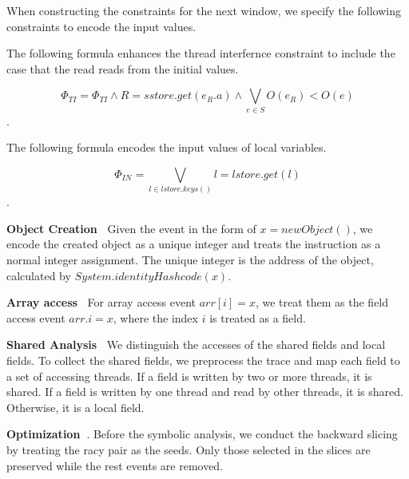 When constructing the constraints for the next window, we specify the following constraints to encode the input values.

The following formula enhances the thread interfernce constraint to include the case that the read reads from the initial values. 

$$\Phi_{TI}=\Phi_{TI} \wedge  R=sstore.get(e_R.a) \wedge \bigvee_{e\in S} O(e_R)<O(e)$$.

The following formula encodes the input values of local variables. 

$$\Phi_{IN}=\bigvee_{l\in lstore.keys()} l=lstore.get(l)$$.
 

{\bf Object Creation\ } Given the event in the form of $x=new Object()$, we encode the created object as a unique integer and treats the instruction as a normal integer assignment. The unique integer is the address of the object, calculated by $System.identityHashcode(x)$.


{\bf Array access\ } For array access event $arr[i]=x$, we treat them as the field access event $arr.i=x$, where the index $i$ is treated as a field. 

{\bf Shared Analysis\ } We distinguish the accesses of the shared fields and local fields. To collect the shared fields, we preprocess the trace and map each field to a set of accessing threads. If a field is written by two or more threads, it is shared. If a field is written by one thread and read by other threads, it is shared. Otherwise, it is a local field. 

{\bf Optimization\ }. Before the symbolic analysis, we conduct the backward slicing by treating the racy pair as the seeds. Only those selected in the slices are preserved while the rest events are removed. 

